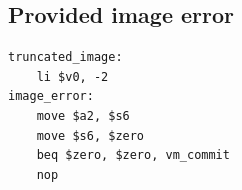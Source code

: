 \subsection{Provided image error}
\begin{verbatim}
truncated_image:
    li $v0, -2
image_error:
    move $a2, $s6
    move $s6, $zero
    beq $zero, $zero, vm_commit
    nop
\end{verbatim}
